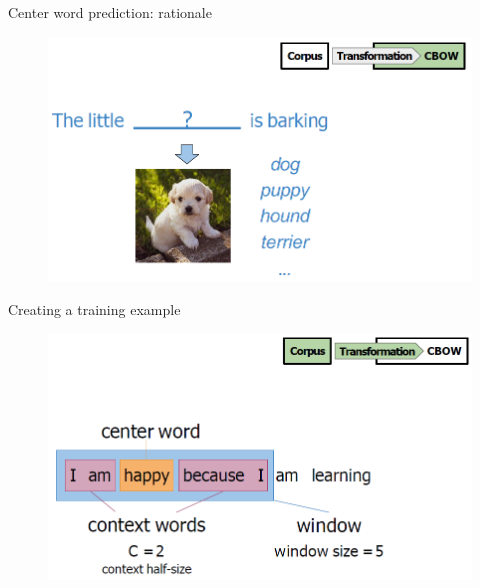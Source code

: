 \begin{frame}[allowframebreaks]{Center word prediction: rationale}
    \begin{figure}
        \centering
        \includegraphics[width=\textwidth,height=0.8\textheight,keepaspectratio]{images/vector-space/center-word-pred.png}
    \end{figure}
\end{frame}

\begin{frame}[allowframebreaks]{Creating a training example}
    \begin{figure}
        \centering
        \includegraphics[width=\textwidth,height=0.8\textheight,keepaspectratio]{images/vector-space/training-example.png}
    \end{figure}
\end{frame}

